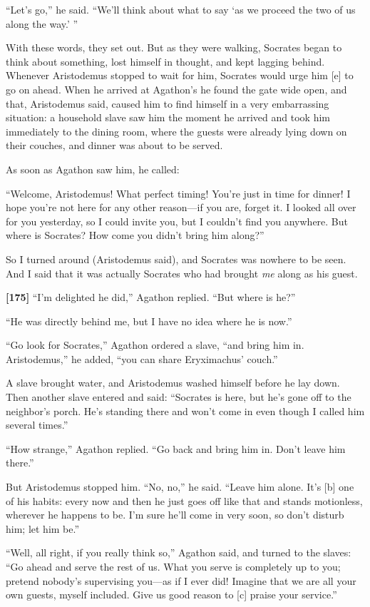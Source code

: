 “Let's go,” he said. “We'll think about what to say ‘as we proceed the
two of us along the way.'
”

With these words, they set out. But as they were walking, Socrates began
to think about something, lost himself in thought, and kept lagging
behind. Whenever Aristodemus stopped to wait for him, Socrates would
urge him {[}e{]} to go on ahead. When he arrived at Agathon's he found
the gate wide open, and that, Aristodemus said, caused him to find
himself in a very embarrassing situation: a household slave saw him the
moment he arrived and took him immediately to the dining room, where the
guests were already lying down on their couches, and dinner was about to
be served.

As soon as Agathon saw him, he called:

“Welcome, Aristodemus! What perfect timing! You're just in time for
dinner! I hope you're not here for any other reason---if you are, forget
it. I looked all over for you yesterday, so I could invite you, but I
couldn't find you anywhere. But where is Socrates? How come you didn't
bring him along?”

So I turned around (Aristodemus said), and Socrates was nowhere to be
seen. And I said that it was actually Socrates who had brought {\em me}
along as his guest.

{\bf {[}175{]}} “I'm delighted he did,” Agathon replied. “But where is
he?”

“He was directly behind me, but I have no idea where he is now.”

“Go look for Socrates,” Agathon ordered a slave, “and bring him in.
Aristodemus,” he added, “you can share Eryximachus' couch.”

A slave brought water, and Aristodemus washed himself before he lay
down. Then another slave entered and said: “Socrates is here, but he's
gone off to the neighbor's porch. He's standing there and won't come in
even though I called him several times.”

“How strange,” Agathon replied. “Go back and bring him in. Don't leave
him there.”

But Aristodemus stopped him. “No, no,” he said. “Leave him alone. It's
{[}b{]} one of his habits: every now and then he just goes off like that
and stands motionless, wherever he happens to be. I'm sure he'll come in
very soon, so don't disturb him; let him be.”

“Well, all right, if you really think so,” Agathon said, and turned to
the slaves: “Go ahead and serve the rest of us. What you serve is
completely up to you; pretend nobody's supervising you---as if I ever
did! Imagine that we are all your own guests, myself included. Give us
good reason to {[}c{]} praise your service.”

